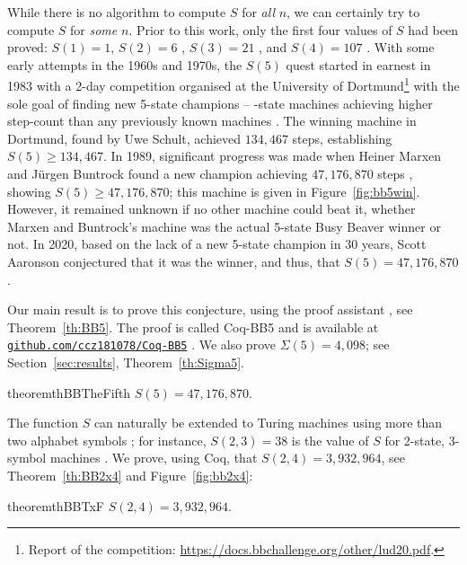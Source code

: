 \documentclass[a4paper,british]{article}
\theoremstyle{definition} %
\numberwithin{equation}{section}
\theoremstyle{definition} %
\newcommand{\BBtheFifth}{47{,}176{,}870}
\newcommand{\SigmaTheFifth}{4{,}098}
\newcommand{\BBTxF}{3{,}932{,}964}
\newcommand{\CoqBB}{Coq-BB5\xspace}
\begin{document}
While there is no algorithm to compute $S$ for \textit{all} $n$, we can certainly try to compute $S$ for \textit{some} $n$. Prior to this work, only the first four values of $S$ had been proved: $S(1)=1$, $S(2)=6$ \cite{Rado_1962}, $S(3) = 21$ \cite{Lin1963}, and $S(4) = 107$ \cite{Brady83}. With some early attempts in the 1960s and 1970s, the $S(5)$ quest started in earnest in 1983 with a 2-day competition organised at the University of Dortmund\footnote{Report of the competition: \url{https://docs.bbchallenge.org/other/lud20.pdf}.} with the sole goal of finding new 5-state champions -- -state machines achieving higher step-count than any previously known machines \cite{PMichel_website,michel2019busy}. The winning machine in Dortmund, found by Uwe Schult, achieved $134{,}467$ steps, establishing $S(5) \geq 134{,}467$. In 1989, significant progress was made when Heiner Marxen and J\"urgen Buntrock found a new champion achieving $\BBtheFifth$ steps \cite{Marxen_1990}, showing $S(5) \geq \BBtheFifth$; this machine is given in Figure~\ref{fig:bb5win}. However, it remained unknown if no other machine could beat it, \ie whether Marxen and Buntrock's machine was the actual 5-state Busy Beaver winner or not. In 2020, based on the lack of a new 5-state champion in 30 years, Scott Aaronson conjectured that it was the winner, and thus, that $S(5) = \BBtheFifth$ \cite{BusyBeaverFrontier}.

Our main result is to prove this conjecture, using the \Coq proof assistant \cite{the_coq_development_team_2024_14542673}, see Theorem~\ref{th:BB5}. The \Coq proof is called \CoqBB and is available at \href{https://github.com/ccz181078/Coq-BB5}{\texttt{github.com/ccz181078/Coq-BB5}} \cite{mxdys_2025_17061968}. We also prove $\Sigma(5) = \SigmaTheFifth$; see Section~\ref{sec:results}, Theorem~\ref{th:Sigma5}.

\begin{restatable}[\CoqBB: \texttt{Lemma BB5\_value}]{theorem}{thBBTheFifth}\label{th:BB5}
    $S(5) = \BBtheFifth$.
\end{restatable}

The function $S$ can naturally be extended to Turing machines using more than two alphabet symbols \cite{BradyMeaningOfLife}; for instance, $S(2,3) = 38$ is the value of $S$ for 2-state, 3-symbol machines \cite{BradyMeaningOfLife, MICHEL200445, LafittePapazian2007}. We prove, using Coq, that $S(2,4) = \BBTxF$, see Theorem~\ref{th:BB2x4} and Figure~\ref{fig:bb2x4}:

\begin{restatable}[\CoqBB: \texttt{Lemma BB2x4\_value}]{theorem}{thBBTxF}\label{th:BB2x4}
    $S(2,4) = \BBTxF$.
\end{restatable}
\end{document}
